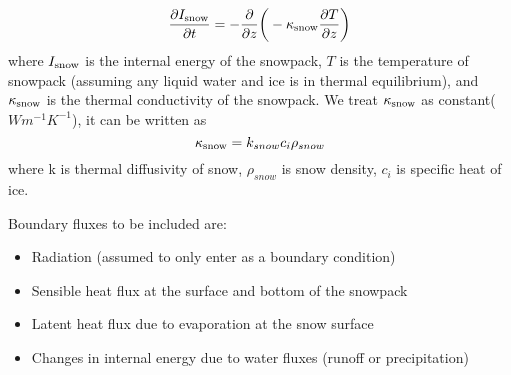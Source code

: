 \documentclass{article}
\begin{document}
\begin{equation}
    \frac{\partial I_{\rm snow}}{\partial t} = -\frac{\partial }{\partial z}\bigg(-\kappa_{\rm snow} \frac{\partial T}{\partial z}\bigg)
\end{equation}
where $I_{\rm snow}$ is the internal energy of the snowpack, $T$ is the temperature of snowpack (assuming any liquid water and ice is in thermal equilibrium), and $\kappa_{\rm snow}$ is the thermal conductivity of the snowpack. We treat $\kappa_{\rm snow}$ as constant($Wm^{-1}K^{-1}$), it can be written as
\begin{equation}
\kappa_{\rm snow} = k_{snow} c_i \rho_{snow}
\end{equation}
where k is thermal diffusivity of snow,  $\rho_{snow}$ is snow density, $c_i$ is specific heat of ice.


Boundary fluxes to be included are:
\begin{itemize}
    \item Radiation (assumed to only enter as a boundary condition)
    \item Sensible heat flux at the surface and bottom of the snowpack
    \item Latent heat flux due to evaporation at the snow surface
    \item Changes in internal energy due to water fluxes (runoff or precipitation)
\end{itemize}
\end{document}
